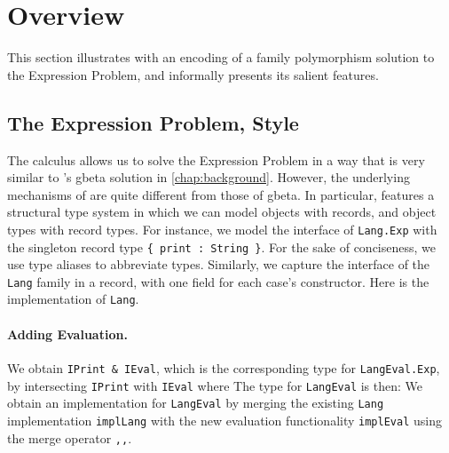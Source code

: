 
\section{Overview}
\label{nested:sec:overview}

This section illustrates \namee with an encoding of a family polymorphism
solution to the Expression Problem, and informally presents its salient
features.


\subsection{The Expression Problem, \namee Style}

The \namee calculus allows us to solve the Expression Problem in a way that is
very similar to \citeauthor{Ernst_2001}'s gbeta solution in \cref{chap:background}. However, the underlying mechanisms of
\namee are quite different from those of gbeta. In particular, \namee features a
structural type system in which we can model objects with records, and object
types with record types. For instance, we model the interface of \lstinline{Lang.Exp}
with the singleton record type \lstinline${ print : String }$. For the sake of
conciseness, we use type aliases to abbreviate types.
Similarly, we capture the interface of the \lstinline{Lang} family in a record,
with one field for each case's constructor.
Here is the implementation of \lstinline{Lang}.

\paragraph{Adding Evaluation.}
We obtain \lstinline{IPrint & IEval}, which is the corresponding type for \lstinline{LangEval.Exp}, by
intersecting \lstinline{IPrint} with \lstinline{IEval} where
The type for \lstinline{LangEval} is then:
We obtain an implementation for \lstinline{LangEval} by merging the existing
\lstinline{Lang} implementation \lstinline{implLang} with the new evaluation
functionality \lstinline{implEval} using the merge operator \lstinline{,,}.

